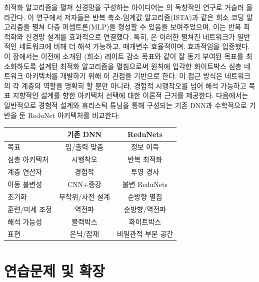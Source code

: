 \documentclass[../../book-main_ko.tex]{subfiles}
\begin{document}
최적화 알고리즘을 펼쳐 신경망을 구성하는 아이디어는 \cite{gregor2010learning}의 독창적인 연구로 거슬러 올라간다. 이 연구에서 저자들은 반복 축소-임계값 알고리즘(ISTA)과 같은 희소 코딩 알고리즘을 펼쳐 다층 퍼셉트론(MLP)을 형성할 수 있음을 보여주었으며, 이는 반복 최적화와 신경망 설계를 효과적으로 연결했다. 특히, \cite{monga2019algorithm}은 이러한 펼쳐진 네트워크가 일반적인 네트워크에 비해 더 해석 가능하고, 매개변수 효율적이며, 효과적임을 입증했다. 이 장에서는 이전에 소개된 (희소) 레이트 감소 목표와 같이 잘 동기 부여된 목표를 최소화하도록 설계된 최적화 알고리즘을 펼침으로써 원칙에 입각한 화이트박스 심층 네트워크 아키텍처를 개발하기 위해 이 관점을 기반으로 한다. 이 접근 방식은 네트워크의 각 계층의 역할을 명확히 할 뿐만 아니라, 경험적 시행착오를 넘어 해석 가능하고 목표 지향적인 설계를 향한 아키텍처 선택에 대한 이론적 근거를 제공한다. 다음에서는 일반적으로 경험적 설계와 휴리스틱 튜닝을 통해 구성되는 기존 DNN과 수학적으로 기반을 둔 ReduNet 아키텍처를 비교한다: 

\begin{center}
\begin{tabular}{| l || c | c |}
\hline
  & 기존 DNN & ReduNets\\ [0.5ex]
  \hline \hline
목표 & 입/출력 맞춤 & 정보 이득\\ [0.5ex]
  \hline
심층 아키텍처 & 시행착오 & 반복 최적화 \\  [0.5ex]
\hline
계층 연산자 & 경험적 & 투영 경사 \\  [0.5ex]
\hline
이동 불변성 & CNN+증강 & 불변 ReduNets \\  [0.5ex]
\hline
초기화 & 무작위/사전 설계 & 순방향 펼침 \\ [0.5ex]
\hline
훈련/미세 조정 & 역전파 & 순방향/역전파\\ [0.5ex]
\hline
해석 가능성 & 블랙박스 & 화이트박스 \\ [0.5ex]
\hline
표현 & 은닉/잠재 & 비일관적 부분 공간 \\ [0.5ex]
\hline
\end{tabular}
\end{center}




\section{연습문제 및 확장}
\end{document}
